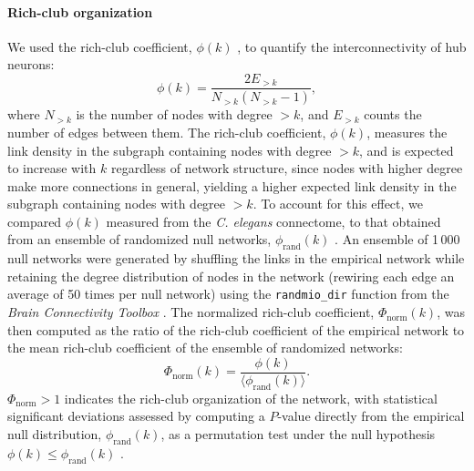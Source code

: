 \documentclass[10pt,letterpaper]{article}
\begin{document}
\paragraph{Rich-club organization}
We used the rich-club coefficient, $\phi(k)$ \cite{Colizza:2006kz}, to quantify the interconnectivity of hub neurons:
\begin{equation}
    \label{eqn:rich_club}
    \phi(k) = \frac{2E_{>k}}{N_{>k}(N_{>k}-1)},
\end{equation}
where $N_{>k}$ is the number of nodes with degree $>k$, and $E_{>k}$ counts the number of edges between them.
The rich-club coefficient, $\phi(k)$, measures the link density in the subgraph containing nodes with degree $>k$, and is expected to increase with $k$ regardless of network structure, since nodes with higher degree make more connections in general, yielding a higher expected link density in the subgraph containing nodes with degree $>k$.
To account for this effect, we compared $\phi(k)$ measured from the \emph{C. elegans} connectome, to that obtained from an ensemble of randomized null networks, $\phi_\mathrm{rand}(k)$ \cite{Colizza:2006kz}.
An ensemble of 1\,000 null networks were generated by shuffling the links in the empirical network while retaining the degree distribution of nodes in the network \cite{Maslov:2002hi} (rewiring each edge an average of 50 times per null network) using the \texttt{randmio\_dir} function from the {\it Brain Connectivity Toolbox} \cite{Rubinov:2010jd}.
The normalized rich-club coefficient, $\Phi_\mathrm{norm}(k)$, was then computed as the ratio of the rich-club coefficient of the empirical network to the mean rich-club coefficient of the ensemble of randomized networks:
\begin{equation}
    \label{eqn:rich_club_norm}
    \Phi_\mathrm{norm}(k) = \frac{\phi(k)}{\langle \phi_\mathrm{rand}(k) \rangle}.
\end{equation}
$\Phi_\mathrm{norm} > 1$ indicates the rich-club organization of the network, with statistical significant deviations assessed by computing a $P$-value directly from the empirical null distribution, $\phi_\mathrm{rand}(k)$, as a permutation test under the null hypothesis $\phi(k) \leq \phi_\mathrm{rand}(k)$ \cite{vandenHeuvel:2011he}.

\end{document}
